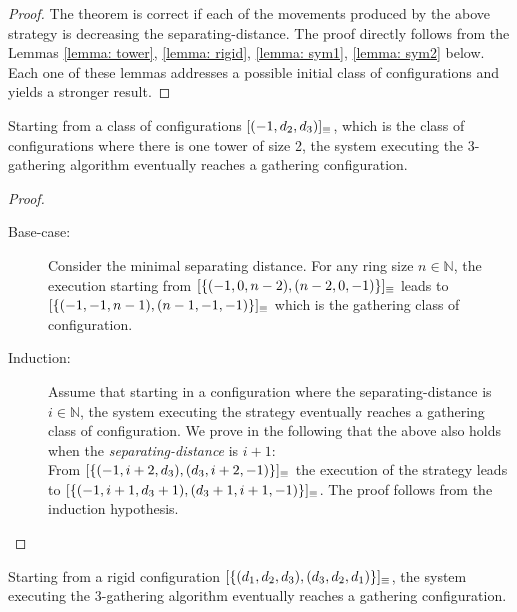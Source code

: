 \begin{proof} 
The theorem is correct if each of the movements produced by the above strategy %
is decreasing the separating-distance.
The proof directly follows from the Lemmas \ref{lemma: tower}, \ref{lemma: rigid}, \ref{lemma: sym1}, \ref{lemma: sym2} below. 
Each one of these lemmas addresses a possible initial class of configurations and yields a stronger result.
\end{proof}

\begin{lemma}
\label{lemma: tower}
Starting from a class of configurations $[(-1, d_2, d_3)]_{\equiv}$, %
which is the class of configurations where there is one tower of size 2, the system executing  the 3-gathering algorithm %
 eventually reaches a gathering configuration. 
\end{lemma}

	\begin{proof}\hfill
	\begin{description}%
		\item [Base-case:  ] Consider the minimal separating distance. For any ring size $n \in \mathbb{N}$, the execution starting from
	 		$[\{(-1, 0, n-2),(n-2,0,-1)\}]_{\equiv}$ leads to $[\{(-1, -1, n-1),(n-1,-1,-1)\}]_{\equiv}$ which is 
			the gathering class of configuration.
		 \item [Induction:  ] Assume that starting in a configuration where the separating-distance
			is $i \in \mathbb{N}$, the system executing the strategy %
			eventually reaches a gathering  class of configuration. We prove in the following that the above
			also holds	 when the \emph{separating-distance} is $i+1$:  \\
			From $[\{(-1, i+2, d_3),(d_3,i+2,-1)\}]_{\equiv}$ the execution of the strategy leads 
			to $[\{(-1, i+1, d_3+1),(d_3+1,i+1,-1)\}]_{\equiv}$.
			The proof follows from the induction hypothesis. 
	\end{description}
	\end{proof}
	
\begin{lemma}
\label{lemma: rigid} %
\label{lemma: rigid15}
Starting from a rigid configuration $[\{(d_1, d_2, d_3),(d_3,d_2,d_1)\}]_{\equiv}$, the system executing  the $3$-gathering algorithm %
eventually reaches a gathering configuration.
\end{lemma}

